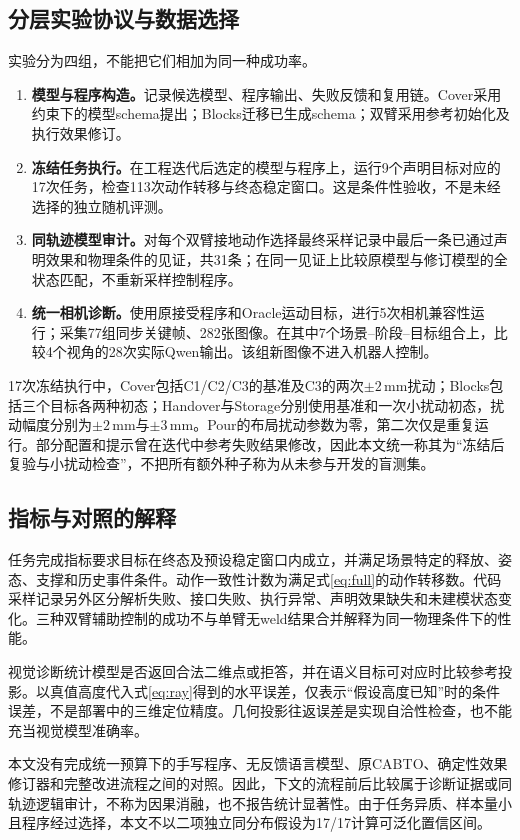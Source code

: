 \documentclass[UTF8,zihao=-4,fontset=fandol,a4paper]{ctexart}
\begin{document}
\subsection{分层实验协议与数据选择}
实验分为四组，不能把它们相加为同一种成功率。
\begin{enumerate}
\item \textbf{模型与程序构造。}记录候选模型、程序输出、失败反馈和复用链。Cover采用约束下的模型schema提出；Blocks迁移已生成schema；双臂采用参考初始化及执行效果修订。
\item \textbf{冻结任务执行。}在工程迭代后选定的模型与程序上，运行9个声明目标对应的17次任务，检查113次动作转移与终态稳定窗口。这是条件性验收，不是未经选择的独立随机评测。
\item \textbf{同轨迹模型审计。}对每个双臂接地动作选择最终采样记录中最后一条已通过声明效果和物理条件的见证，共31条；在同一见证上比较原模型与修订模型的全状态匹配，不重新采样控制程序。
\item \textbf{统一相机诊断。}使用原接受程序和Oracle运动目标，进行5次相机兼容性运行；采集77组同步关键帧、282张图像。在其中7个场景--阶段--目标组合上，比较4个视角的28次实际Qwen输出。该组新图像不进入机器人控制。
\end{enumerate}

17次冻结执行中，Cover包括C1/C2/C3的基准及C3的两次$\pm2$\,mm扰动；Blocks包括三个目标各两种初态；Handover与Storage分别使用基准和一次小扰动初态，扰动幅度分别为$\pm2$\,mm与$\pm3$\,mm。Pour的布局扰动参数为零，第二次仅是重复运行。部分配置和提示曾在迭代中参考失败结果修改，因此本文统一称其为“冻结后复验与小扰动检查”，不把所有额外种子称为从未参与开发的盲测集。

\subsection{指标与对照的解释}
任务完成指标要求目标在终态及预设稳定窗口内成立，并满足场景特定的释放、姿态、支撑和历史事件条件。动作一致性计数为满足式\eqref{eq:full}的动作转移数。代码采样记录另外区分解析失败、接口失败、执行异常、声明效果缺失和未建模状态变化。三种双臂辅助控制的成功不与单臂无weld结果合并解释为同一物理条件下的性能。

视觉诊断统计模型是否返回合法二维点或拒答，并在语义目标可对应时比较参考投影。以真值高度代入式\eqref{eq:ray}得到的水平误差，仅表示“假设高度已知”时的条件误差，不是部署中的三维定位精度。几何投影往返误差是实现自洽性检查，也不能充当视觉模型准确率。

本文没有完成统一预算下的手写程序、无反馈语言模型、原CABTO、确定性效果修订器和完整改进流程之间的对照。因此，下文的流程前后比较属于诊断证据或同轨迹逻辑审计，不称为因果消融，也不报告统计显著性。由于任务异质、样本量小且程序经过选择，本文不以二项独立同分布假设为17/17计算可泛化置信区间。
\end{document}

